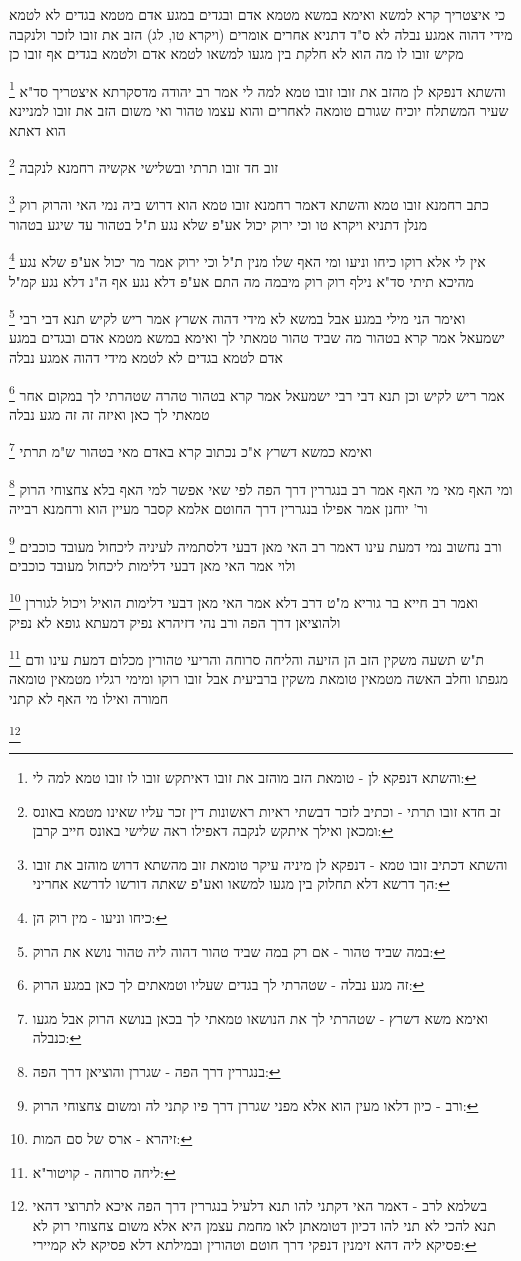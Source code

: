 \documentclass[12pt, openany]{book}
\newcommand{\footnotecomment}[1]{
	\renewcommand\thefootnote{}
	\footnote{#1}}
\newcommand{\commenta}[1]{\footnotecomment{#1}}
\begin{document}
{כי איצטריך קרא למשא ואימא במשא מטמא אדם ובגדים במגע אדם מטמא בגדים לא לטמא מידי דהוה אמגע נבלה 
לא ס"ד דתניא אחרים אומרים (ויקרא טו, לג) הזב את זובו לזכר ולנקבה מקיש זובו לו מה הוא לא חלקת בין מגעו למשאו לטמא אדם ולטמא בגדים אף זובו כן 
\commenta{והשתא דנפקא לן - טומאת הזב מוהזב את זובו דאיתקש זובו לו זובו טמא למה לי:}
והשתא דנפקא לן מהזב את זובו זובו טמא למה לי 
אמר רב יהודה מדסקרתא איצטריך סד"א שעיר המשתלח יוכיח שגורם טומאה לאחרים והוא עצמו טהור ואי משום הזב את זובו למניינא הוא דאתא 
\commenta{זב חדא זובו תרתי - וכתיב לזכר דבשתי ראיות ראשונות דין זכר עליו שאינו מטמא באונס ומכאן ואילך איתקש לנקבה דאפילו ראה שלישי באונס חייב קרבן:}
זוב חד זובו תרתי ובשלישי אקשיה רחמנא לנקבה 
\commenta{והשתא דכתיב זובו טמא - דנפקא לן מיניה עיקר טומאת זוב מהשתא דרוש מוהזב את זובו הך דרשא דלא תחלוק בין מגעו למשאו ואע"פ שאתה דורשו לדרשא אחריני:}
כתב רחמנא זובו טמא והשתא דאמר רחמנא זובו טמא הוא דרוש ביה נמי האי
והרוק רוק מנלן דתניא {ויקרא טו } וכי ירוק יכול אע"פ שלא נגע ת"ל בטהור עד שיגע בטהור 
\commenta{כיחו וניעו - מין רוק הן:}
אין לי אלא רוקו כיחו וניעו ומי האף שלו מנין ת"ל וכי ירוק 
אמר מר יכול אע"פ שלא נגע מהיכא תיתי 
סד"א נילף רוק רוק מיבמה מה התם אע"פ דלא נגע אף ה"נ דלא נגע קמ"ל 
\commenta{במה שביד טהור - אם רק במה שביד טהור דהוה ליה טהור נושא את הרוק:}
ואימר הני מילי במגע אבל במשא לא מידי דהוה אשרץ אמר ריש לקיש תנא דבי רבי ישמעאל אמר קרא בטהור מה שביד טהור טמאתי לך 
ואימא במשא מטמא אדם ובגדים במגע אדם לטמא בגדים לא לטמא מידי דהוה אמגע נבלה 
\commenta{זה מגע נבלה - שטהרתי לך בגדים שעליו וטמאתים לך כאן במגע הרוק:}
אמר ריש לקיש וכן תנא דבי רבי ישמעאל אמר קרא בטהור טהרה שטהרתי לך במקום אחר טמאתי לך כאן ואיזה זה זה מגע נבלה 
\commenta{ואימא משא דשרץ - שטהרתי לך את הנושאו טמאתי לך בכאן בנושא הרוק אבל מגעו כנבלה:}
ואימא כמשא דשרץ א"כ נכתוב קרא באדם מאי בטהור ש"מ תרתי
\commenta{בנגררין דרך הפה - שגררן והוציאן דרך הפה:}
ומי האף מאי מי האף אמר רב בנגררין דרך הפה לפי שאי אפשר למי האף בלא צחצוחי הרוק ור' יוחנן אמר אפילו בנגררין דרך החוטם אלמא קסבר מעיין הוא ורחמנא רבייה 
\commenta{ורב - כיון דלאו מעין הוא אלא מפני שגררן דרך פיו קתני לה ומשום צחצוחי הרוק:}
ורב נחשוב נמי דמעת עינו דאמר רב האי מאן דבעי דלסתמיה לעיניה ליכחול מעובד כוכבים ולוי אמר האי מאן דבעי דלימות ליכחול מעובד כוכבים 
\commenta{זיהרא - ארס של סם המות:}
ואמר רב חייא בר גוריא מ"ט דרב דלא אמר האי מאן דבעי דלימות הואיל ויכול לגוררן ולהוציאן דרך הפה ורב נהי דזיהרא נפיק דמעתא גופא לא נפיק 
\commenta{ליחה סרוחה - קויטור"א:}
ת"ש תשעה משקין הזב הן הזיעה והליחה סרוחה והריעי טהורין מכלום דמעת עינו ודם מגפתו וחלב האשה מטמאין טומאת משקין ברביעית אבל זובו רוקו ומימי רגליו מטמאין טומאה חמורה ואילו מי האף לא קתני 
\commenta{בשלמא לרב - דאמר האי דקתני להו תנא דלעיל בנגררין דרך הפה איכא לתרוצי דהאי תנא להכי לא תני להו דכיון דטומאתן לאו מחמת עצמן היא אלא משום צחצוחי רוק לא פסיקא ליה דהא זימנין דנפקי דרך חוטם וטהורין ובמילתא דלא פסיקא לא קמיירי:}
}
\end{document}
